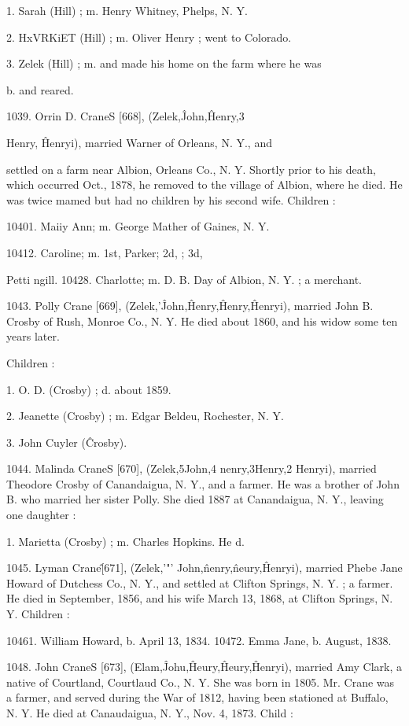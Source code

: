 \documentclass{book}
\begin{document}
1. Sarah (Hill) ; m. Henry Whitney, Phelps, N. Y. 

2. HxVRKiET (Hill) ; m. Oliver Henry ; went to Colorado. 

3. Zelek (Hill) ; m. and made his home on the farm where he was 

b. and reared. 

1039. Orrin D. CraneS [668], (Zelek,\^ John,\^ Henry,3 

Henry, \^ Henryi), married Warner of Orleans, N. Y., and 

settled on a farm near Albion, Orleans Co., N. Y. Shortly prior 
to his death, which occurred Oct., 1878, he removed to the 
village of Albion, where he died. He was twice mamed but had 
no children by his second wife. Children : 

10401. Maiiy Ann; m. George Mather of Gaines, N. Y. 

10412. Caroline; m. 1st,  Parker; 2d, ; 3d, 

Petti ngill. 
10428. Charlotte; m. D. B. Day of Albion, N. Y. ; a merchant. 

1043. Polly Crane [669], (Zelek,'\^ John,\^ Henry,\^ Henry,\^ 
Henryi), married John B. Crosby of Rush, Monroe Co., N. Y. 
He died about 1860, and his widow some ten years later. 

Children : 

1. O. D. (Crosby) ; d. about 1859. 

2. Jeanette (Crosby) ; m. Edgar Beldeu, Rochester, N. Y. 

3. John Cuyler (\^Crosby). 

1044. Malinda CraneS [670], (Zelek,5John,4 nenry,3Henry,2 
Henryi), married Theodore Crosby of Canandaigua, N. Y., and 
a farmer. He was a brother of John B. who married her sister 
Polly. She died 1887 at Canandaigua, N. Y., leaving one 
daughter : 

1. Marietta (Crosby) ; m. Charles Hopkins. He d. 

1045. Lyman Crane\^ [671], (Zelek,'"' John,\^ nenry,\^ neury,\^ 
Henryi), married Phebe Jane Howard of Dutchess Co., N. Y., 
and settled at Clifton Springs, N. Y. ; a farmer. He died in 
September, 1856, and his wife March 13, 1868, at Clifton Springs, 
N. Y. Children : 

10461. William Howard, b. April 13, 1834. 
10472. Emma Jane, b. August, 1838. 




1048. John CraneS [673], (Elam,\^ Johu,\^ Heury,\^ Heury,\^ 
Henryi), married Amy Clark, a native of Courtland, Courtlaud 
Co., N. Y. She was born in 1805. Mr. Crane was a farmer, 
and served during the War of 1812, having been stationed at 
Buffalo, N. Y. He died at Canaudaigua, N. Y., Nov. 4, 1873. 
Child : 
\end{document}
